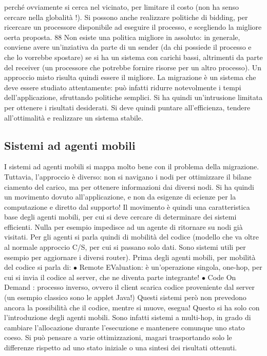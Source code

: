 perché ovviamente si cerca nel
vicinato, per limitare il costo (non ha senso cercare nella globalità !). Si possono
anche realizzare politiche di bidding, per ricercare un processore disponibile ad
eseguire il processo, e scegliendo la migliore oerta proposta.
88
Non esiste una politica migliore in assoluto: in generale, conviene avere
un'inziativa da parte di un sender (da chi possiede il processo e che lo vorrebbe
spostare) se si ha un sistema con carichi bassi, altrimenti da parte del receiver
(un processore che potrebbe fornire risorse per un altro processo). Un approccio
misto risulta quindi essere il migliore.
La migrazione è un sistema che deve essere studiato attentamente: può
infatti ridurre notevolmente i tempi dell'applicazione, sfruttando politiche semplici. Si ha quindi un'intrusione
limitata per ottenere i risultati desiderati. Si
deve quindi puntare all'efficienza, tendere all'ottimalità e realizzare un sistema
stabile.
\subsection{Sistemi ad agenti mobili}
I sistemi ad agenti mobili si mappa molto bene con il problema della migrazione.
Tuttavia, l'approccio è diverso: non si navigano i nodi per ottimizzare il bilane
ciamento del carico, ma per ottenere informazioni dai diversi nodi. Si ha quindi
un movimento dovuto all'applicazione, e non da esigenze di ecienze per la
computazione e diretto dal supporto!
Il movimento è quindi una caratteristica base degli agenti mobili, per cui si
deve cercare di determinare dei sistemi efficienti. Nulla per esempio impedisce
ad un agente di ritornare su nodi già visitati.
Per gli agenti si parla quindi di mobilità del codice (modello che va oltre
al normale approccio C/S, per cui si passano solo dati. Sono sistemi utili per
esempio per aggiornare i diversi router). Prima degli agenti mobili, per mobilità
del codice si parla di:
$\bullet$ Remote EValuation: è un'operazione singola, one-hop, per cui si invia il
codice al server, che ne diventa parte integrante!
$\bullet$ Code On Demand : processo inverso, ovvero il client scarica codice proveniente dal server (un esempio classico
sono le applet Java!)
Questi sistemi però non prevedono ancora la possibilità che il codice, mentre si
muove, esegua! Questo si ha solo con l'introduzione degli agenti mobili. Sono infatti sistemi a multi-hop, in grado di
cambiare l'allocazione durante l'esecuzione
e mantenere comunque uno stato coeso. Si può pensare a varie ottimizzazioni,
magari trasportando solo le differenze rispetto ad uno stato iniziale o una sintesi
dei risultati ottenuti.
